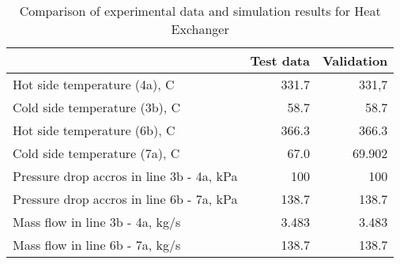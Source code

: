 \begin{table}
\label{tab:Comparison}
\caption{Comparison of experimental data and simulation results for Heat Exchanger}
\begin{center}
\begin{tabulary}{0.9\textwidth}{LRR}
\toprule
& Test data \cite{Iverson_2013}  & Validation \\
\midrule
Hot side temperature (4a), C & 331.7 & 331,7 \\
Cold side temperature (3b), C & 58.7 & 58.7 \\
Hot side temperature (6b), C & 366.3 & 366.3 \\
Cold side temperature (7a), C & 67.0 & 69.902 \\
Pressure drop accros in line 3b - 4a, kPa & 100 & 100 \\
Pressure drop accros in line 6b - 7a, kPa & 138.7 & 138.7 \\
Mass flow in line 3b - 4a, kg/s & 3.483 & 3.483 \\
Mass flow in line 6b - 7a, kg/s & 138.7 & 138.7 \\
\bottomrule
\end{tabulary}
\end{center}
\end{table}